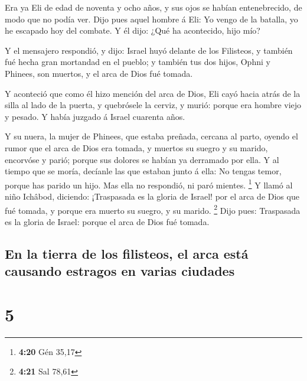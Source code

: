  Era ya Eli de edad de noventa y ocho años, y sus ojos se
habían entenebrecido, de modo que no podía ver.  Dijo
pues aquel hombre á Eli: Yo vengo de la batalla, yo he escapado hoy del
combate. Y él dijo: ¿Qué ha acontecido, hijo mío?

 Y el mensajero respondió, y dijo: Israel huyó delante de
los Filisteos, y también fué hecha gran mortandad en el pueblo; y
también tus dos hijos, Ophni y Phinees, son muertos, y el arca de Dios
fué tomada.

 Y aconteció que como él hizo mención del arca de Dios,
Eli cayó hacia atrás de la silla al lado de la puerta, y quebrósele la
cerviz, y murió: porque era hombre viejo y pesado. Y había juzgado á
Israel cuarenta años.

 Y su nuera, la mujer de Phinees, que estaba preñada,
cercana al parto, oyendo el rumor que el arca de Dios era tomada, y
muertos su suegro y su marido, encorvóse y parió; porque sus dolores se
habían ya derramado por ella.  Y al tiempo que se moría,
decíanle las que estaban junto á ella: No tengas temor, porque has
parido un hijo. Mas ella no respondió, ni paró mientes. \footnote{\textbf{4:20}
  Gén 35,17}  Y llamó al niño Ichâbod, diciendo:
¡Traspasada es la gloria de Israel! por el arca de Dios que fué tomada,
y porque era muerto su suegro, y su marido. \footnote{\textbf{4:21} Sal
  78,61}  Dijo pues: Traspasada es la gloria de Israel:
porque el arca de Dios fué tomada.

\hypertarget{en-la-tierra-de-los-filisteos-el-arca-estuxe1-causando-estragos-en-varias-ciudades}{%
\subsection{En la tierra de los filisteos, el arca está causando
estragos en varias
ciudades}\label{en-la-tierra-de-los-filisteos-el-arca-estuxe1-causando-estragos-en-varias-ciudades}}

\hypertarget{section-4}{%
\section{5}\label{section-4}}

